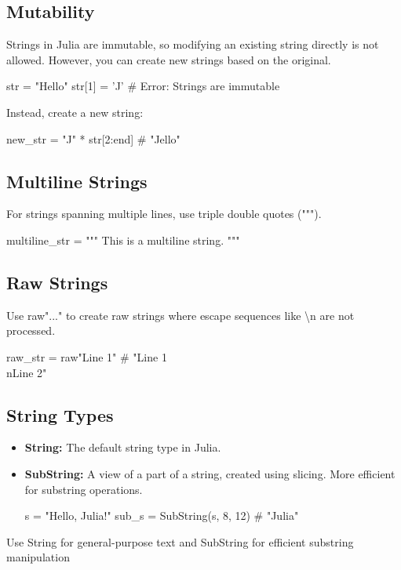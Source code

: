 \documentclass{report}
\begin{document}
    \subsection{Mutability}
    \bigbreak \noindent 
    Strings in Julia are immutable, so modifying an existing string directly is not allowed. However, you can create new strings based on the original.
    \bigbreak \noindent 
    \begin{jlcode}
    str = "Hello"
    str[1] = 'J'  # Error: Strings are immutable
    \end{jlcode}
    \bigbreak \noindent 
    Instead, create a new string:
    \bigbreak \noindent 
    \begin{jlcode}
    new_str = "J" * str[2:end]  # "Jello"
    \end{jlcode}
    \bigbreak \noindent 
    \subsection{Multiline Strings}
    \bigbreak \noindent 
    For strings spanning multiple lines, use triple double quotes (""").
    \bigbreak \noindent 
    \begin{jlcode}
        multiline_str = """
        This is a
        multiline string.
        """
    \end{jlcode}

    \bigbreak \noindent 
    \subsection{Raw Strings}
    \bigbreak \noindent 
    Use raw"..." to create raw strings where escape sequences like \textbackslash n are not processed.
    \bigbreak \noindent 
    \begin{jlcode}
    raw_str = raw"Line 1"  # "Line 1\\nLine 2"
    \end{jlcode}
    \bigbreak \noindent 
    \subsection{String Types}
    \bigbreak \noindent 
    \begin{itemize}
        \item \textbf{String:} The default string type in Julia.
        \item \textbf{SubString:} A view of a part of a string, created using slicing. More efficient for substring operations.
            \bigbreak \noindent 
            \begin{jlcode}
                s = "Hello, Julia!"
                sub_s = SubString(s, 8, 12)  # "Julia"
            \end{jlcode}
    \end{itemize}
    \bigbreak \noindent 
    Use String for general-purpose text and SubString for efficient substring manipulation
\end{document}
